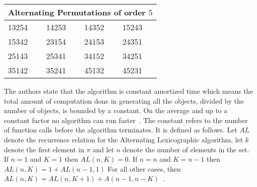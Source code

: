 \begin{center}
\begin{table}
\begin{tabular}{ |p{3cm}||p{3cm}|p{3cm}|p{3cm}|  }
 \hline
 \multicolumn{4}{|c|}{Alternating Permutations of order $5$} \\
 \hline
 \hline
 13254   & 14253    &14352&  15243\\\hline
 15342&  23154  & 24153   &24351\\\hline
 25143 &25341 & 34152&  34251\\\hline
 35142    &35241 & 45132&  45231\\
 \hline
\end{tabular}
\label{Table:AltPerms}
\end{table}
\end{center}

The authors state that the algorithm is constant amortized time which means the total amount of
computation done in generating all the objects, divided by the number of objects, is
bounded by a constant. On the average and up to a constant factor no algorithm can
run faster~\cite{A19}. The constant refers to the number of function calls before the algorithm terminates. It is defined as follows. 
Let $AL$ denote the recurrence relation for the Alternating Lexicographic algorithm, let $k$ denote the 
first element in $\pi$ and let $n$ denote the number of elements in the set. 
If $n=1$ and $K=1$ then $AL(n, K)=0$. If $n=n$ and $K=n-1$ then $AL(n,K)= 1 + AL(n-1,1)$ For all other cases, 
then $AL(n, K) = AL(n, K+1) + A(n-1, n-K)$~\cite{A19}.


